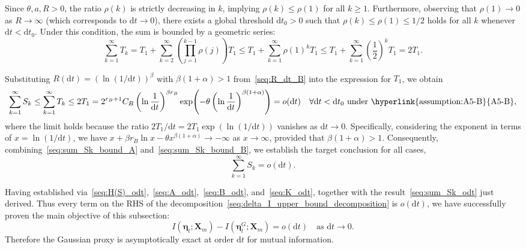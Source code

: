 Since $\theta, a, R > 0$, the ratio $\rho(k)$ is strictly decreasing in $k$, implying $\rho(k)\leq\rho(1)$ for all $k\ge 1$. Furthermore, observing that $\rho(1)\rightarrow0$ as $R\rightarrow\infty$ (which corresponds to $\mathrm dt\rightarrow0$), there exists a global threshold $\mathrm dt_0>0$ such that $\rho(k)\leq\rho(1)\leq1/2$ holds for all $k$ whenever $\mathrm dt<\mathrm dt_0$. Under this condition, the sum is bounded by a geometric series:
\begin{equation*}
    \sum_{k=1}^\infty T_k
    =T_1+\sum_{k=2}^\infty\left(\prod_{j=1}^{k-1} \rho(j)\right)T_1
    \leq T_1+\sum_{k=1}^\infty\rho(1)^kT_1
    \leq T_1+\sum_{k=1}^\infty\left(\frac{1}{2}\right)^k T_1
    =2T_1.
\end{equation*}

Substituting $R(\mathrm dt)=(\ln(1/\mathrm dt))^\beta$ with $\beta(1+\alpha)>1$ from~\eqref{seq:R_dt_B} into the expression for $T_1$, we obtain
\begin{equation}
    \sum_{k=1}^\infty S_k
    \leq\sum_{k=1}^\infty T_k\leq2T_1
    =2^{r_B+1}C_B\left(\ln\frac{1}{\mathrm dt}\right)^{\beta r_B}
    \exp\!\left(-\theta\left(\ln\frac{1}{\mathrm dt}\right)^{\beta(1+\alpha)}\right)
    =o(\mathrm dt)
    \quad\forall\mathrm dt<\mathrm dt_0
    \text{ under~\hyperlink{assumption:A5-B}{A5-B}},
    \label{seq:sum_Sk_bound_B}
\end{equation}
where the limit holds because the ratio $2T_1/\mathrm dt = 2T_1 \exp(\ln(1/\mathrm dt))$ vanishes as $\mathrm dt\rightarrow0$. Specifically, considering the exponent in terms of $x=\ln(1/\mathrm dt)$, we have $x+\beta r_B\ln x-\theta x^{\beta(1+\alpha)}\rightarrow-\infty$ as $x\rightarrow\infty$, provided that $\beta(1+\alpha)>1$.
Consequently, combining~\eqref{seq:sum_Sk_bound_A} and~\eqref{seq:sum_Sk_bound_B}, we establish the target conclusion for all cases,
\begin{equation}
    \sum_{k=1}^\infty S_k=o(\mathrm dt).
    \label{seq:sum_Sk_odt}
\end{equation}

Having established via~\eqref{seq:H(S)_odt},~\eqref{seq:A_odt},~\eqref{seq:B_odt}, and~\eqref{seq:K_odt}, together with the result~\eqref{seq:sum_Sk_odt} just derived. Thus every term on the RHS of the decomposition~\eqref{seq:delta_I_upper_bound_decomposition} is $o(\mathrm dt)$, we have successfully proven the main objective of this subsection:
\begin{equation}
    I(\bm\eta_t;\bm X_m)-I(\bm\eta_t^G;\bm X_m)=o(\mathrm dt)
    \quad\text{as }\mathrm dt\rightarrow0.
    \label{seq:deltaI_odt}
\end{equation}
Therefore the Gaussian proxy is asymptotically exact at order $\mathrm dt$ for mutual information.

